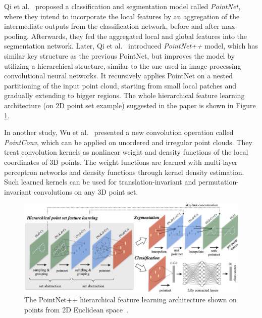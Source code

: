 \noindent Qi et al.~\cite{DBLP:journals/corr/QiSMG16} proposed a classification and segmentation model called \textit{PointNet}, where they intend to incorporate the local features by an aggregation of the intermediate outputs from the classification network, before and after max-pooling. Afterwards, they fed the aggregated local and global features into the segmentation network. Later, Qi et al.~\cite{DBLP:journals/corr/QiYSG17} introduced \textit{PointNet++} model, which has similar key structure as the previous PointNet, but improves the model by utilizing a hierarchical structure, similar to the one used in image processing convolutional neural networks. It recursively applies PointNet on a nested partitioning of the input point cloud, starting from small local patches and gradually extending to bigger regions. The whole hierarchical feature learning architecture (on 2D point set example) suggested in the paper is shown in Figure \ref{fig:Pointnet2}. \par

\vspace{5mm}

\noindent In another study, Wu et al.~\cite{DBLP:journals/corr/abs-1811-07246} presented a new convolution operation called \textit{PointConv}, which can be applied on unordered and irregular point clouds. They treat convolution kernels as nonlinear weight and density functions of the local coordinates of 3D points. The weight functions are learned with multi-layer perceptron networks and density functions through kernel density estimation. Such learned kernels can be used for translation-invariant and permutation-invariant convolutions on any 3D point set. \par
\vspace{5mm}
\begin{figure}[H]
\begin{center}
  \includegraphics[width=\textwidth]{images/related_work/pointnet2.jpg}
  \caption[The PointNet++ hierarchical feature learning architecture~\cite{DBLP:journals/corr/QiYSG17}.]{The PointNet++ hierarchical feature learning architecture shown on points from 2D Euclidean space~\cite{DBLP:journals/corr/QiYSG17}.}
  \label{fig:Pointnet2}
\end{center}
\end{figure}


